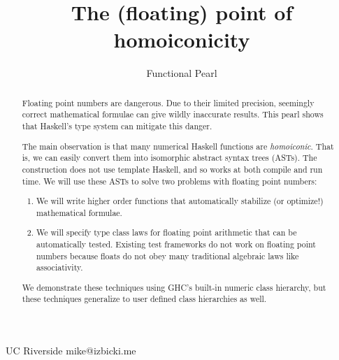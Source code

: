 \documentclass[preprint]{sigplanconf}
\theoremstyle{definition}
\begin{document}
\setlength{\pdfpageheight}{\paperheight}
\setlength{\pdfpagewidth}{\paperwidth}




\title{The (floating) point of homoiconicity}
\subtitle{Functional Pearl}

           {UC Riverside}
           {mike@izbicki.me}

\maketitle

\begin{abstract}
Floating point numbers are dangerous.
Due to their limited precision,
seemingly correct mathematical formulae can give wildly inaccurate results.
This pearl shows that Haskell's type system can mitigate this danger.

The main observation is that many numerical Haskell functions are \emph{homoiconic}.
That is, we can easily convert them into isomorphic abstract syntax trees (ASTs).
The construction does not use template Haskell, and so works at both compile and run time.
We will use these ASTs to solve two problems with floating point numbers:
\begin{enumerate}
\item
We will write higher order functions that automatically stabilize (or optimize!) mathematical formulae.
\item
We will specify type class laws for floating point arithmetic that can be automatically tested.
Existing test frameworks do not work on floating point numbers because floats do not obey many traditional algebraic laws like associativity.
\end{enumerate}
We demonstrate these techniques using GHC's built-in numeric class hierarchy,
but these techniques generalize to user defined class hierarchies as well.
\end{abstract}
\end{document}
